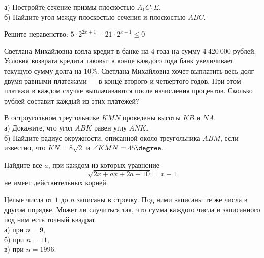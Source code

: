 \begin{training}[1]
\begin{listofex}
		а)  Постройте сечение призмы плоскостью \( A_1C_1E \).\\		
		б)  Найдите угол между плоскостью сечения и плоскостью \( ABC \).
		\item Решите неравенство: \( 5\cdot2^{2x+1}-21\cdot2^{x-1}\le0 \)
		\item Светлана Михайловна взяла кредит в банке на \( 4 \) года на сумму \( 4\: 420\: 000 \) рублей. Условия возврата кредита таковы: в конце каждого года банк увеличивает текущую сумму долга на \( 10\% \). Светлана Михайловна хочет выплатить весь долг двумя равными платежами --- в конце второго и четвертого годов. При этом платежи в каждом случае выплачиваются после начисления процентов. Сколько рублей составит каждый из этих платежей?
		\item В остроугольном треугольнике \( KMN \) проведены высоты \( KB \) и \( NA \).\\
		а)  Докажите, что угол \( ABK \) равен углу \( ANK \).	\\
		б)  Найдите радиус окружности, описанной около треугольника \( ABM \), если известно, что \( KN=8\sqrt{2} \) и \( \angle KMN=45\degree \).
		\item Найдите все \( a \), при каждом из которых уравнение 
		\[ \sqrt{2x+ax+2a+10}=x-1 \]
		не имеет действительных корней.
		\item Целые числа от \( 1 \) до \( n \) записаны в строчку. Под ними записаны те же числа в другом порядке. Может ли случиться так, что сумма каждого числа и записанного под ним есть точный квадрат.\\
		а)  при \( n=9 \),\\		
		б)  при \( n=11 \),\\		
		в)  при \( n=1996 \).
	\end{listofex}
\end{training}

